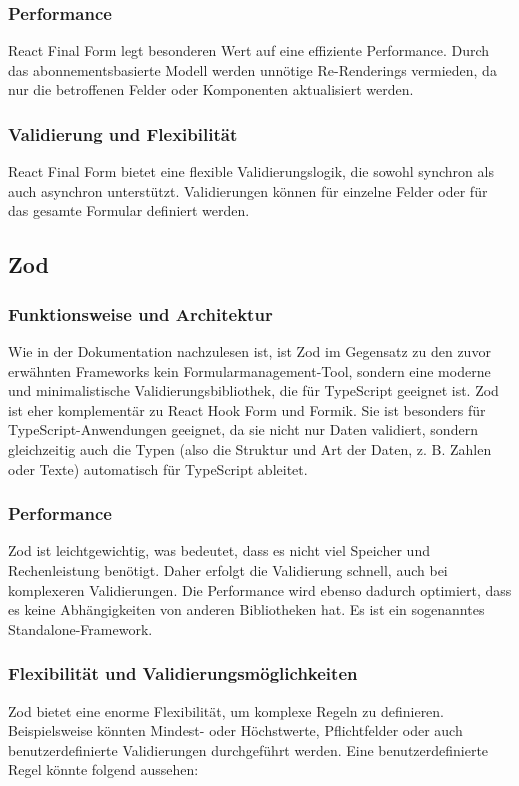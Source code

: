         \subsubsection{Performance}
        React Final Form legt besonderen Wert auf eine effiziente Performance. Durch das abonnementsbasierte Modell werden unnötige Re-Renderings vermieden, da nur die betroffenen Felder oder Komponenten aktualisiert werden. 
    
        \subsubsection{Validierung und Flexibilität}
        React Final Form bietet eine flexible Validierungslogik, die sowohl synchron als auch asynchron unterstützt. Validierungen können für einzelne Felder oder für das gesamte Formular definiert werden. \cite{prompt16_pollak}


    \subsection{Zod}
        \subsubsection{Funktionsweise und Architektur} 
        Wie in der Dokumentation nachzulesen ist, ist Zod\cite{zod} im Gegensatz zu den zuvor erwähnten Frameworks kein Formularmanagement-Tool, sondern eine moderne und minimalistische Validierungsbibliothek, die für TypeScript geeignet ist. Zod ist eher komplementär zu React Hook Form und Formik. Sie ist besonders für TypeScript-Anwendungen geeignet, da sie nicht nur Daten validiert, sondern gleichzeitig auch die Typen (also die Struktur und Art der Daten, z. B. Zahlen oder Texte) automatisch für TypeScript ableitet. 

        \subsubsection{Performance}
        Zod ist leichtgewichtig, was bedeutet, dass es nicht viel Speicher und Rechenleistung benötigt. Daher erfolgt die Validierung schnell, auch bei komplexeren Validierungen. Die Performance wird ebenso dadurch optimiert, dass es keine Abhängigkeiten von anderen Bibliotheken hat. Es ist ein sogenanntes Standalone-Framework.

        \subsubsection{Flexibilität und Validierungsmöglichkeiten}
        Zod bietet eine enorme Flexibilität, um komplexe Regeln zu definieren. Beispielsweise könnten Mindest- oder Höchstwerte, Pflichtfelder oder auch benutzerdefinierte Validierungen durchgeführt werden. Eine benutzerdefinierte Regel könnte folgend aussehen:

